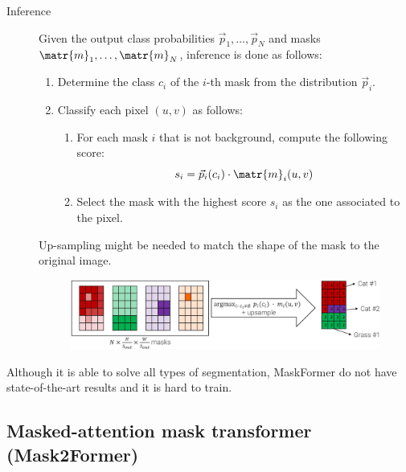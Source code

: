 \begin{description}
\begin{description}
            \item[Inference]
                Given the output class probabilities $\vec{p}_1, \dots, \vec{p}_N$ and masks $\matr{m}_1, \dots, \matr{m}_N$, inference is done as follows:
                \begin{enumerate}
                    \item Determine the class $c_i$ of the $i$-th mask from the distribution $\vec{p}_i$.
                    \item Classify each pixel $(u, v)$ as follows:
                    \begin{enumerate}
                        \item For each mask $i$ that is not background, compute the following score:
                        \[ s_i = \vec{p}_i(c_i) \cdot \matr{m}_i(u, v) \]
                        \item Select the mask with the highest score $s_i$ as the one associated to the pixel.
                    \end{enumerate}
                \end{enumerate}

                \begin{remark}
                    Up-sampling might be needed to match the shape of the mask to the original image.
                \end{remark}

                \begin{figure}[H]
                    \centering
                    \includegraphics[width=0.8\linewidth]{./img/_maskformer_inference.jpg}
                \end{figure}
        \end{description}

    \begin{remark}
        Although it is able to solve all types of segmentation, MaskFormer do not have state-of-the-art results and it is hard to train.
    \end{remark}
\end{description}


\subsection{Masked-attention mask transformer (Mask2Former)}


